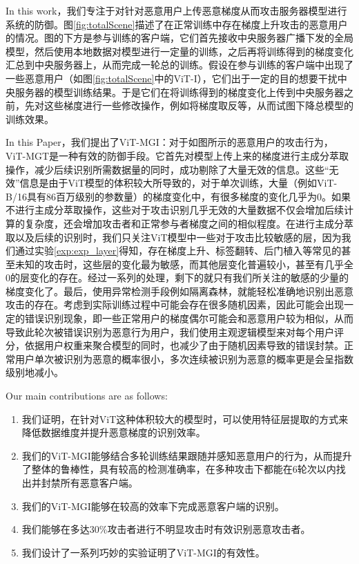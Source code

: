 \documentclass[conference]{IEEEtran}
\begin{document}
In this work，我们专注于对针对恶意用户上传恶意梯度从而攻击服务器模型进行系统的防御。图\hyperref[fig:totalScene]{\ref{fig:totalScene}}描述了在正常训练中存在梯度上升攻击的恶意用户的情况。图的下方是参与训练的客户端，它们首先接收中央服务器广播下发的全局模型，然后使用本地数据对模型进行一定量的训练，之后再将训练得到的梯度变化汇总到中央服务器上，从而完成一轮总的训练。假设在参与训练的客户端中出现了一些恶意用户（如图\hyperref[fig:totalScene]{\ref{fig:totalScene}}中的ViT-I），它们出于一定的目的想要干扰中央服务器的模型训练结果。于是它们在将训练得到的梯度变化上传到中央服务器之前，先对这些梯度进行一些修改操作，例如将梯度取反等，从而试图下降总模型的训练效果。

In this Paper，我们提出了ViT-MGI：对于如图所示的恶意用户的攻击行为，ViT-MGT是一种有效的防御手段。它首先对模型上传上来的梯度进行主成分萃取操作，减少后续识别所需数据量的同时，成功剔除了大量无效的信息。这些“无效”信息是由于ViT模型的体积较大所导致的，对于单次训练，大量（例如ViT-B/16具有86百万级别的参数量）的梯度变化中，有很多梯度的变化几乎为0。如果不进行主成分萃取操作，这些对于攻击识别几乎无效的大量数据不仅会增加后续计算的复杂度，还会增加攻击者和正常参与者梯度之间的相似程度。在进行主成分萃取以及后续的识别时，我们只关注ViT模型中一些对于攻击比较敏感的层，因为我们通过实验\hyperref[exp:exp_layer]{\ref{exp:exp_layer}}得知，存在梯度上升、标签翻转、后门植入等常见的甚至未知的攻击时，这些层的变化最为敏感，而其他层变化普遍较小，甚至有几乎全0的层变化的存在。经过一系列的处理，剩下的就只有我们所关注的敏感的少量的梯度变化了。最后，使用异常检测手段例如隔离森林，就能轻松准确地识别出恶意攻击的存在。考虑到实际训练过程中可能会存在很多随机因素，因此可能会出现一定的错误识别现象，即一些正常用户的梯度偶尔可能会和恶意用户较为相似，从而导致此轮次被错误识别为恶意行为用户，我们使用主观逻辑模型来对每个用户评分，依据用户权重来聚合模型的同时，也减少了由于随机因素导致的错误封禁。正常用户单次被识别为恶意的概率很小，多次连续被识别为恶意的概率更是会呈指数级别地减小。

Our main contributions are as follows:

\begin{enumerate}
    \item 我们证明，在针对ViT这种体积较大的模型时，可以使用特征层提取的方式来降低数据维度并提升恶意梯度的识别效率。
    \item 我们的ViT-MGI能够结合多轮训练结果跟随并感知恶意用户的行为，从而提升了整体的鲁棒性，具有较高的检测准确率，在多种攻击下都能在6轮次以内找出并封禁所有恶意客户端。
    \item 我们的ViT-MGI能够在较高的效率下完成恶意客户端的识别。
    \item 我们能够在多达$30\%$攻击者进行不明显攻击时有效识别恶意攻击者。
    \item 我们设计了一系列巧妙的实验证明了ViT-MGI的有效性。
\end{enumerate}
\end{document}
